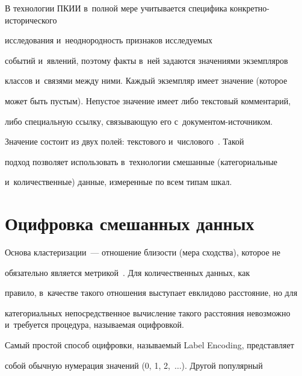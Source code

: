   


  В технологии ПКИИ в~полной мере учитывается специфика конкретно-ис\-то\-ри\-че\-ско\-го 


  исследования и~неоднородность признаков исследуемых 


событий и~явлений, поэтому факты в~ней задаются значениями экземпляров 


классов и~связями между ними. Каждый экземпляр имеет значение (которое 


может быть пустым). Непустое значение имеет либо текстовый комментарий, 


либо специальную ссылку, связывающую его с~документом-источником. 


Значение состоит из двух полей: текстового и~числового~\cite{2-ad}. Такой 


подход позволяет использовать в~технологии смешанные (категориальные 


и~количественные) данные, измеренные по всем типам шкал.





\vspace*{-4pt}





\section{Оцифровка смешанных данных}





\vspace*{-4pt}


  


  Основа кластеризации~--- отношение близости (мера сходства), которое не 


обязательно является метрикой~\cite{11-ad}. Для количественных данных, как 


правило, в~качестве такого отношения выступает евклидово расстояние, но для 


категориальных непосредственное вычисление такого расстояния невозможно и~требуется процедура, называемая оцифровкой. 


  


  Самый простой способ оцифровки, называемый Label Encoding, пред\-став\-ля\-ет 


собой обычную нумерация значений (0, 1, 2,\ $\ldots$). Другой популярный 


